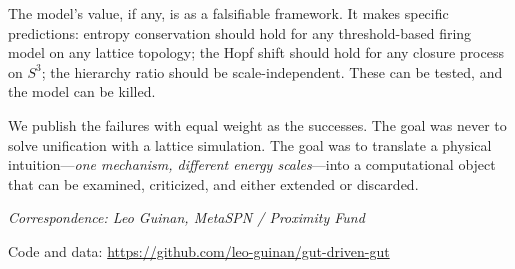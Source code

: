 \documentclass[letterpaper,12pt]{article}
\begin{document}
The model's value, if any, is as a falsifiable framework. It makes specific predictions: entropy conservation should hold for any threshold-based firing model on any lattice topology; the Hopf shift should hold for any closure process on $S^3$; the hierarchy ratio should be scale-independent. These can be tested, and the model can be killed.

We publish the failures with equal weight as the successes. The goal was never to solve unification with a lattice simulation. The goal was to translate a physical intuition---\emph{one mechanism, different energy scales}---into a computational object that can be examined, criticized, and either extended or discarded.

\nocite{Penrose2004, Baez2002}



\bigskip
\noindent\emph{Correspondence: Leo Guinan, MetaSPN / Proximity Fund}

\bigskip
\noindent Code and data: \url{https://github.com/leo-guinan/gut-driven-gut}
\end{document}
